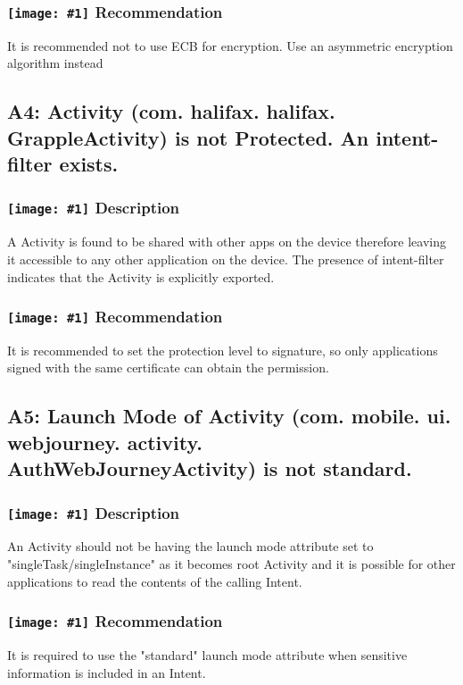 \documentclass[12p]{article}
\newcommand{\icon}[1]{\texttt{[image: \#1]}}
\begin{document}
\subsubsection*{\protect\icon{/home/miki/Documents/GITHUB/AndroidPermissions/python/vulns/report_icons/basic_todo.png} Recommendation}
It is recommended not to use ECB for encryption. Use an asymmetric encryption algorithm instead
\subsection{A4: Activity (com. halifax. halifax. GrappleActivity) is not Protected. An intent-filter exists.}
\subsubsection*{\protect\icon{/home/miki/Documents/GITHUB/AndroidPermissions/python/vulns/report_icons/basic_sheet.png} Description}
A  Activity is found to be shared with other apps on the device therefore leaving it accessible to any other application on the device. The presence of intent-filter indicates that the Activity is explicitly exported.
\subsubsection*{\protect\icon{/home/miki/Documents/GITHUB/AndroidPermissions/python/vulns/report_icons/basic_todo.png} Recommendation}
It is recommended to set the protection level to signature, so only applications signed with the same certificate can obtain the permission.
\subsection{A5: Launch Mode of Activity (com. mobile. ui. webjourney. activity. AuthWebJourneyActivity) is not standard.}
\subsubsection*{\protect\icon{/home/miki/Documents/GITHUB/AndroidPermissions/python/vulns/report_icons/basic_sheet.png} Description}
An Activity should not be having the launch mode attribute set to "singleTask/singleInstance" as it becomes root Activity and it is possible for other applications to read the contents of the calling Intent.
\subsubsection*{\protect\icon{/home/miki/Documents/GITHUB/AndroidPermissions/python/vulns/report_icons/basic_todo.png} Recommendation}
It is required to use the "standard" launch mode attribute when sensitive information is included in an Intent.
\end{document}
